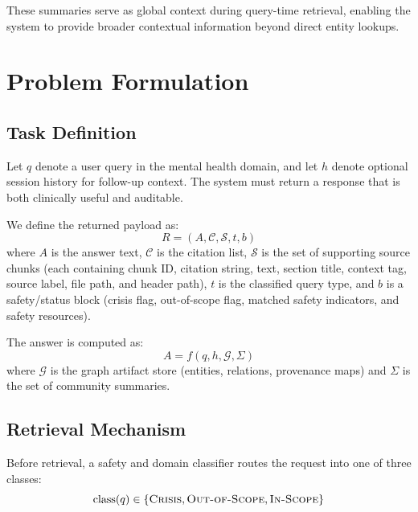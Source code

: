 \documentclass[12pt,a4paper]{article}
\begin{document}
These summaries serve as global context during query-time retrieval, enabling the system to provide broader contextual information beyond direct entity lookups.

\section{Problem Formulation}

\subsection{Task Definition}

Let $q$ denote a user query in the mental health domain, and let $h$ denote optional session history for follow-up context. The system must return a response that is both clinically useful and auditable.

We define the returned payload as:
\begin{equation}
    R = \left(A, \mathcal{C}, \mathcal{S}, t, b\right)
\end{equation}
where $A$ is the answer text, $\mathcal{C}$ is the citation list, $\mathcal{S}$ is the set of supporting source chunks (each containing chunk ID, citation string, text, section title, context tag, source label, file path, and header path), $t$ is the classified query type, and $b$ is a safety/status block (crisis flag, out-of-scope flag, matched safety indicators, and safety resources).

The answer is computed as:
\begin{equation}
    A = f(q, h, \mathcal{G}, \Sigma)
\end{equation}
where $\mathcal{G}$ is the graph artifact store (entities, relations, provenance maps) and $\Sigma$ is the set of community summaries.

\subsection{Retrieval Mechanism}

Before retrieval, a safety and domain classifier routes the request into one of three classes:
\begin{equation}
    \text{class}(q) \in \{\textsc{Crisis}, \textsc{Out-of-Scope}, \textsc{In-Scope}\}
\end{equation}
\end{document}
